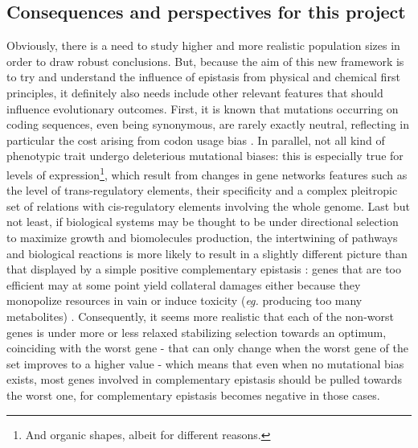 \documentclass[11pt,onecolumn]{article}
\begin{document}
\subsection{Consequences and perspectives for this project}

Obviously, there is a need to study higher and more realistic population sizes in order to draw robust conclusions. But, because the aim of this new framework is to try and understand the influence of epistasis from physical and chemical first principles, it definitely also needs include other relevant features that should influence evolutionary outcomes. First, it is known that mutations occurring on coding sequences, even being synonymous, are rarely exactly neutral, reflecting in particular the cost arising from codon usage bias \citep{Ikemura85,Galtier18,laBella19}. In parallel, not all kind of phenotypic trait undergo deleterious mutational biases: this is especially true for levels of expression\footnote{And organic shapes, albeit for different reasons.},  which result from changes in gene networks features such as the level of trans-regulatory elements, their specificity and a complex pleitropic set of relations with cis-regulatory elements \citep{Hodgkin98,Chesmore16} involving the whole genome. Last but not least, if biological systems may be thought to be under directional selection to maximize growth and biomolecules production, the intertwining of pathways and biological reactions is more likely to result in a slightly different picture than that displayed by a simple positive complementary epistasis : genes that are too efficient may at some point yield collateral damages either because they monopolize resources in vain or induce toxicity (\textit{eg.} producing too many metabolites) \citep{Lilja17,Niehaus20,Labourel20}. Consequently, it seems more realistic that each of the non-worst genes is under more or less relaxed stabilizing selection towards an optimum, coinciding with the worst gene  -  that can only change when the worst gene of the set improves to a higher value - which means that even when no mutational bias exists, most genes involved in complementary epistasis should be pulled towards the worst one, for complementary epistasis becomes negative in those cases.
\end{document}
